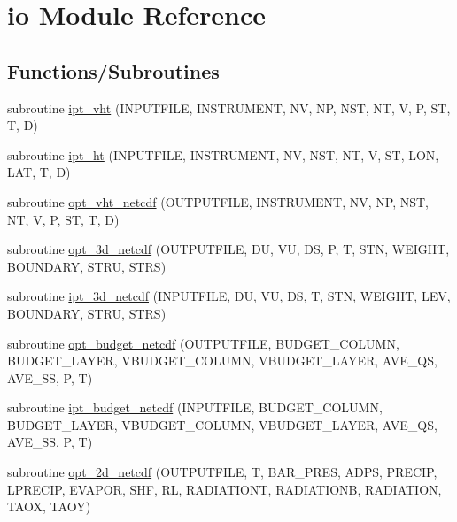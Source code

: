 \hypertarget{namespaceio}{}\section{io Module Reference}
\label{namespaceio}
\subsection*{Functions/\+Subroutines}
\begin{DoxyCompactItemize}
\item 
subroutine \hyperlink{namespaceio_abed61f2af0a37265b7a1d15300f61996}{ipt\+\_\+vht} (I\+N\+P\+U\+T\+F\+I\+LE, I\+N\+S\+T\+R\+U\+M\+E\+NT, NV, NP, N\+ST, NT, V, P, ST, T, D)
\item 
subroutine \hyperlink{namespaceio_ae478b0148dea487c688bfea00e08cade}{ipt\+\_\+ht} (I\+N\+P\+U\+T\+F\+I\+LE, I\+N\+S\+T\+R\+U\+M\+E\+NT, NV, N\+ST, NT, V, ST, L\+ON, L\+AT, T, D)
\item 
subroutine \hyperlink{namespaceio_a1feb605e982e6696d29a63e635b8d3e1}{opt\+\_\+vht\+\_\+netcdf} (O\+U\+T\+P\+U\+T\+F\+I\+LE, I\+N\+S\+T\+R\+U\+M\+E\+NT, NV, NP, N\+ST, NT, V, P, ST, T, D)
\item 
subroutine \hyperlink{namespaceio_a63d1618c60598d1e5ac65348efb74bdc}{opt\+\_\+3d\+\_\+netcdf} (O\+U\+T\+P\+U\+T\+F\+I\+LE, DU, VU, DS, P, T, S\+TN, W\+E\+I\+G\+HT, B\+O\+U\+N\+D\+A\+RY, S\+T\+RU, S\+T\+RS)
\item 
subroutine \hyperlink{namespaceio_a0f9f8edb9a7173638e450ce3c4db7844}{ipt\+\_\+3d\+\_\+netcdf} (I\+N\+P\+U\+T\+F\+I\+LE, DU, VU, DS, T, S\+TN, W\+E\+I\+G\+HT, L\+EV, B\+O\+U\+N\+D\+A\+RY, S\+T\+RU, S\+T\+RS)
\item 
subroutine \hyperlink{namespaceio_ab1a423779bddf2d4557f39dd81431d93}{opt\+\_\+budget\+\_\+netcdf} (O\+U\+T\+P\+U\+T\+F\+I\+LE, B\+U\+D\+G\+E\+T\+\_\+\+C\+O\+L\+U\+MN, B\+U\+D\+G\+E\+T\+\_\+\+L\+A\+Y\+ER, V\+B\+U\+D\+G\+E\+T\+\_\+\+C\+O\+L\+U\+MN, V\+B\+U\+D\+G\+E\+T\+\_\+\+L\+A\+Y\+ER, A\+V\+E\+\_\+\+QS, A\+V\+E\+\_\+\+SS, P, T)
\item 
subroutine \hyperlink{namespaceio_aba707a842ac0a3e2e9def20af0b36c32}{ipt\+\_\+budget\+\_\+netcdf} (I\+N\+P\+U\+T\+F\+I\+LE, B\+U\+D\+G\+E\+T\+\_\+\+C\+O\+L\+U\+MN, B\+U\+D\+G\+E\+T\+\_\+\+L\+A\+Y\+ER, V\+B\+U\+D\+G\+E\+T\+\_\+\+C\+O\+L\+U\+MN, V\+B\+U\+D\+G\+E\+T\+\_\+\+L\+A\+Y\+ER, A\+V\+E\+\_\+\+QS, A\+V\+E\+\_\+\+SS, P, T)
\item 
subroutine \hyperlink{namespaceio_ab6bcb3dc7b4a08b242b7fbd4e11ed319}{opt\+\_\+2d\+\_\+netcdf} (O\+U\+T\+P\+U\+T\+F\+I\+LE, T, B\+A\+R\+\_\+\+P\+R\+ES, A\+D\+PS, P\+R\+E\+C\+IP, L\+P\+R\+E\+C\+IP, E\+V\+A\+P\+OR, S\+HF, RL, R\+A\+D\+I\+A\+T\+I\+O\+NT, R\+A\+D\+I\+A\+T\+I\+O\+NB, R\+A\+D\+I\+A\+T\+I\+ON, T\+A\+OX, T\+A\+OY)

\end{DoxyCompactItemize}
